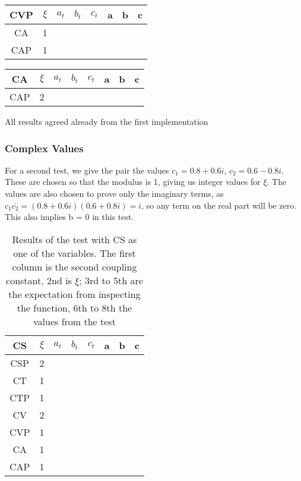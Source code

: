 \documentclass[twocolumn]{article}
\begin{document}
\begin{table}[H]
	\begin{tabular}{|c|c|c|c|c|c|c|c|}
		\hline
		CVP & $\xi $& $a_t$ & $b_t$ & $c_t$ & a & b & c \\
		\hline
		CA & 1 &   &   &   &   &   &   \\
		\hline
		CAP & 1 &   &   &   &   &   &   \\
		\hline
	\end{tabular}
\end{table}

\begin{table}[H]
	\begin{tabular}{|c|c|c|c|c|c|c|c|}
		\hline
		CA & $\xi $& $a_t$ & $b_t$ & $c_t$ & a & b & c \\
		\hline
		CAP & 2 &   &   &   &   &   &   \\
		\hline
	\end{tabular}
\end{table}


All results agreed already from the first implementation

\subsubsection{Complex Values}

For a second test, we give the pair the values $c_1 = 0.8 + 0.6i$, $c_2 = 0.6 - 0.8i$. These are chosen so that the modulus is 1, giving us integer values for $\xi$. The values are also chosen to prove only the imaginary terms, as $c_1\overline{c_2} = (0.8+0.6i)(0.6+0.8i) = i$, so any term on the real part will be zero. This also implies b = 0  in this test.

\begin{table}[H]
	\begin{tabular}{|c|c|c|c|c|c|c|c|}
		\hline
		CS & $\xi $& $a_t$ & $b_t$ & $c_t$ & a & b & c \\
		\hline
		CSP & 2 &   &   &   &   &   &  \\
		\hline
		CT & 1 &   &   &   &   &   &  \\
		\hline
		CTP & 1 &   &   &   &   &   &  \\
		\hline
		CV & 2 &   &   &   &   &   &  \\
		\hline
		CVP & 1 &   &   &   &   &   &  \\
		\hline
		CA & 1 &   &   &   &   &   &  \\
		\hline
		CAP & 1 &   &   &   &   &   &  \\
		\hline
	\end{tabular}
	\caption{Results of the test with CS as one of the variables. The first column is the second coupling constant, 2nd is $\xi$; 3rd to 5th are the expectation from inspecting the function, 6th to 8th the values from the test}
\end{table}
\end{document}
